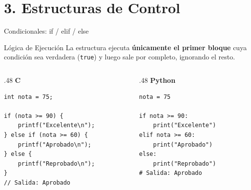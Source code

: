 \documentclass{beamer}
\begin{document}
\section{3. Estructuras de Control}

\begin{frame}[fragile]{Condicionales: if / elif / else}
  \begin{alertblock}{Lógica de Ejecución}
    La estructura ejecuta \textbf{únicamente el primer bloque} cuya condición sea verdadera (\texttt{true}) y luego sale por completo, ignorando el resto.
  \end{alertblock}

  \begin{columns}[T]
    \begin{column}{.48\textwidth}
      \centering\textbf{C}
      \begin{verbatim}
int nota = 75;

if (nota >= 90) {
    printf("Excelente\n");
} else if (nota >= 60) {
    printf("Aprobado\n");
} else {
    printf("Reprobado\n");
}
// Salida: Aprobado
      \end{verbatim}
    \end{column}
    \begin{column}{.48\textwidth}
      \centering\textbf{Python}
      \begin{verbatim}
nota = 75

if nota >= 90:
    print("Excelente")
elif nota >= 60:
    print("Aprobado")
else:
    print("Reprobado")
# Salida: Aprobado
      \end{verbatim}
    \end{column}
  \end{columns}
\end{frame}
\end{document}
